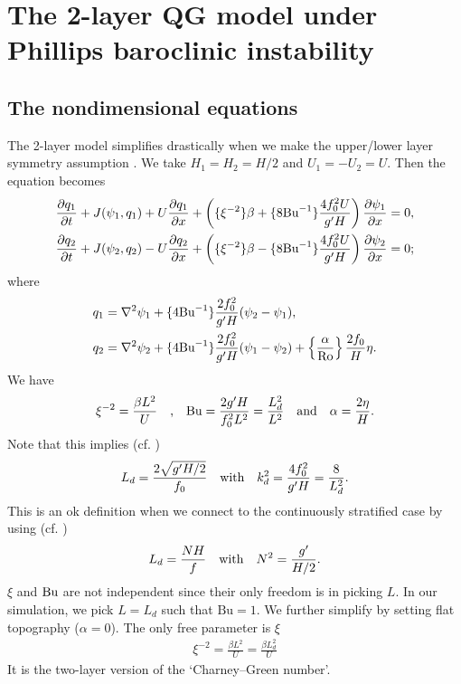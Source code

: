 \section{The 2-layer QG model under Phillips baroclinic instability}
\subsection{The nondimensional equations}
The 2-layer model simplifies drastically when we make the upper/lower layer symmetry assumption \parencite{LarichevHeld_95}. We take $H_1=H_2 = H/2$ and $U_1=-U_2=U$. Then the equation becomes
\begin{align}
    &\frac{\partial q_1}{\partial t}+J(\psi_1,q_1)+U\frac{\partial q_1}{\partial x}+\left(\{\xi^{-2}\}\beta+\{8\text{Bu}^{-1}\}\frac{4f_0^2U}{g'H}\right)\frac{\partial\psi_1}{\partial x} = 0,\label{eq:2lay_sym_eq1}\\
    &\frac{\partial q_2}{\partial t}+J(\psi_2,q_2)-U\frac{\partial q_2}{\partial x}+\left(\{\xi^{-2}\}\beta-\{8\text{Bu}^{-1}\}\frac{4f_0^2U}{g'H}\right)\frac{\partial\psi_2}{\partial x} = 0;\label{eq:2lay_sym_eq2}
\end{align}
where
\begin{align}
    q_1 &= \nabla^2\psi_1 + \{4\text{Bu}^{-1}\}\frac{2f_0^2}{g'H}(\psi_2-\psi_1),\label{eq:2lay_sym_pv1}\\
    q_2 &= \nabla^2\psi_2 + \{4\text{Bu}^{-1}\}\frac{2f_0^2}{g'H}(\psi_1-\psi_2)+\left\{\frac{\alpha}{\text{Ro}}\right\}\frac{2f_0}{H}\eta.\label{eq:2lay_sym_pv2}
\end{align}
We have 
\begin{align}
    \xi^{-2} = \frac{\beta L^2}{U} \quad \mbox{,} \quad \text{Bu} = \frac{2g'H}{f_0^2L^2} = \frac{L_{d}^2}{L^2} \quad \mbox{and} \quad \alpha = \frac{2\eta}{H}.
\end{align}
Note that this implies (cf. \cite[(9.103)]{Vallis_17})
\begin{align}
    L_d = \frac{2\sqrt{g'H/2}}{f_0} \quad \mbox{with} \quad k_d^2 = \frac{4f_0^2}{g'H} = \frac{8}{L_d^2}.
\end{align}
This is an ok definition when we connect to the continuously stratified case by using (cf. \cite[(5.138)]{Vallis_17})
\begin{align}
    L_d = \frac{NH}{f} \quad \mbox{with} \quad N^2 = \frac{g'}{H/2}.
\end{align}
$\xi$ and $\text{Bu}$ are not independent since their only freedom is in picking $L$. In our simulation, we pick $L=L_d$ such that $\text{Bu}=1$. 
We further simplify by setting flat topography ($\alpha=0$). The only free parameter is $\xi$
\begin{align}
    \xi^{-2}= \frac{\beta L^2}{U} = \frac{\beta L_d^2}{U}
\end{align}
It is the two-layer version of the `Charney–Green number’. 

